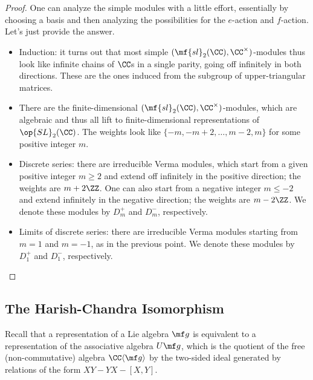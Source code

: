 \documentclass[../notes.tex]{subfiles}
\begin{document}
\begin{proof}
	One can analyze the simple modules with a little effort, essentially by choosing a basis and then analyzing the possibilities for the $e$-action and $f$-action. Let's just provide the answer.
	\begin{itemize}
		\item Induction: it turns out that most simple $(\mf{sl}_2(\CC),\CC^\times)$-modules thus look like infinite chains of $\CC$s in a single parity, going off infinitely in both directions. These are the ones induced from the subgroup of upper-triangular matrices.
		\item There are the finite-dimensional $(\mf{sl}_2(\CC),\CC^\times)$-modules, which are algebraic and thus all lift to finite-dimensional representations of $\op{SL}_2(\CC)$. The weights look like $\{-m,-m+2,\ldots,m-2,m\}$ for some positive integer $m$.
		\item Discrete series: there are irreducible Verma modules, which start from a given positive integer $m\ge2$ and extend off infinitely in the positive direction; the weights are $m+2\ZZ$. One can also start from a negative integer $m\le-2$ and extend infinitely in the negative direction; the weights are $m-2\ZZ$. We denote these modules by $D_m^+$ and $D_m^-$, respectively.
		\item Limits of discrete series: there are irreducible Verma modules starting from $m=1$ and $m=-1$, as in the previous point. We denote these modules by $D_1^+$ and $D_1^-$, respectively.
		\qedhere
	\end{itemize}
\end{proof}

\subsection{The Harish-Chandra Isomorphism}
Recall that a representation of a Lie algebra $\mf g$ is equivalent to a representation of the associative algebra $U\mf g$, which is the quotient of the free (non-commutative) algebra $\CC\langle\mf g\rangle$ by the two-sided ideal generated by relations of the form $XY-YX-[X,Y]$.
\end{document}
